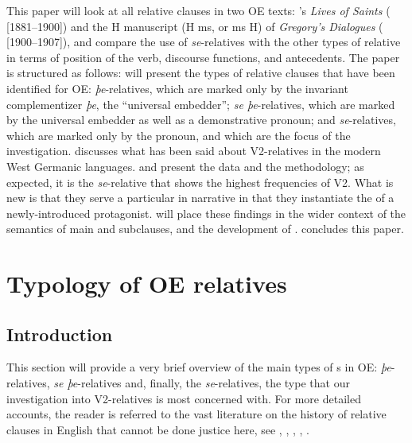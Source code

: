 \documentclass[output=paper,colorlinks,citecolor=brown]{langscibook}
\begin{document}
This paper will look at all relative clauses in two OE texts: 's \textit{Lives of Saints} (\citet{Skeat1966} [1881–1900]) and the H manuscript (H ms, or ms H) of \textit{Gregory's Dialogues} (\cite{Hecht1965} [1900–1907]), and compare the use of \textit{se}{}-relatives with the other types of relative in terms of position of the verb, discourse functions, and antecedents. The paper is structured as follows:  will present the types of relative clauses that have been identified for OE: \textit{þe}{}-relatives, which are marked only by the invariant complementizer \textit{þe}, the “universal embedder”; \textit{se þe}{}-relatives, which are marked by the universal embedder as well as a demonstrative pronoun; and \textit{se}{}-relatives, which are marked only by the pronoun, and which are the focus of the investigation.  discusses what has been said about V2-relatives in the modern West Germanic languages.  and  present the data and the methodology; as expected, it is the \textit{se}{}-relative that shows the highest frequencies of V2. What is new is that they serve a particular  in narrative in that they instantiate the  of a newly-introduced protagonist.  will place these findings in the wider context of the semantics of main and subclauses, and the development of .  concludes this paper.


\section{Typology of OE relatives} \label{sec:los:2}

\subsection{Introduction}\label{sec:los:2.1}
This section will provide a very brief overview of the main types of s in OE: \textit{þe}{}-relatives, \textit{se þe}{}-relatives and, finally, the \textit{se}{}-relatives, the type that our investigation into V2-relatives is most concerned with. For more detailed accounts, the reader is referred to the vast literature on the history of relative clauses in English that cannot be done justice here, see \citet{Allen1977}, \citet[$§§$2130ff]{Mitchell1985}, \citet[232]{Traugott1992}, \citet[659ff]{Fischer2000}, \citet{Suárez-Gómez2012}. 
\end{document}
